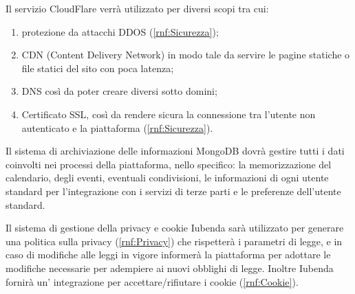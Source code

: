 \begin{listaPersonale}[BE]{}
 Il servizio CloudFlare verrà utilizzato per diversi scopi tra cui:
\begin{enumerate}
    \item protezione da attacchi DDOS (\ref{rnf:Sicurezza});
    \item CDN (Content Delivery Network) in modo tale da servire le pagine statiche o file statici del sito con poca latenza;
    \item DNS così da poter creare diversi sotto domini;
    \item Certificato SSL, così da rendere sicura la connessione tra l'utente non autenticato e la piattaforma (\ref{rnf:Sicurezza}).
\end{enumerate}

 Il sistema di archiviazione delle informazioni MongoDB dovrà gestire tutti i dati coinvolti nei processi della piattaforma, nello specifico: la memorizzazione del calendario, degli eventi, eventuali condivisioni, le informazioni di ogni utente standard per l'integrazione con i servizi di terze parti e le preferenze dell'utente standard.

 Il sistema di gestione della privacy e cookie Iubenda sarà utilizzato per generare una politica sulla privacy (\ref{rnf:Privacy}) che rispetterà i parametri di legge, e in caso di modifiche alle leggi in vigore informerà la piattaforma per adottare le modifiche necessarie per adempiere ai nuovi obblighi di legge. Inoltre Iubenda fornirà un' integrazione per accettare/rifiutare i cookie (\ref{rnf:Cookie}).

\end{listaPersonale}

